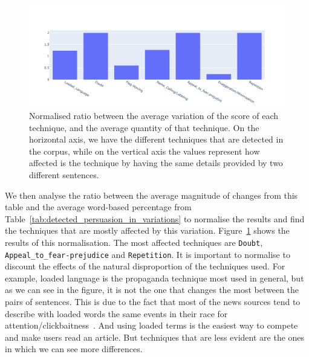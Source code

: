 \begin{figure}[!htbp]
    \centering
    \includegraphics[width=\linewidth]{figures/4.3.1_normalised_ratio_scores.pdf}
    \caption{Normalised ratio between the average variation of the score of each technique, and the average quantity of that technique. On the horizontal axis, we have the different techniques that are detected in the corpus, while on the vertical axis the values represent how affected is the technique by having the same details provided by two different sentences.}
    \label{fig:normalised_ratio_scores_persuasion}
\end{figure}

We then analyse the ratio between the average magnitude of changes from this table and the average word-based percentage from Table~\ref{tab:detected_persuasion_in_variations} to normalise the results and find the techniques that are mostly affected by this variation.
Figure~\ref{fig:normalised_ratio_scores_persuasion} shows the results of this normalisation. The most affected techniques are \texttt{Doubt}, \texttt{Appeal\_to\_fear-prejudice} and \texttt{Repetition}.
It is important to normalise to discount the effects of the natural disproportion of the techniques used. For example, loaded language is the propaganda technique most used in general, but as we can see in the figure, it is not the one that changes the most between the pairs of sentences. This is due to the fact that most of the news sources tend to describe with loaded words the same events in their race for attention/clickbaitness~\citep{bazaco2019clickbait,davenport2001attention}. And using loaded terms is the easiest way to compete and make users read an article. But techniques that are less evident are the ones in which we can see more differences.


